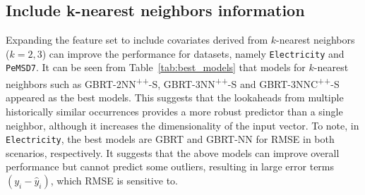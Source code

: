 \subsection{Include k-nearest neighbors information} %

Expanding the feature set to include covariates derived from $k$-nearest neighbors ($k=2, 3$) can improve the performance for datasets, namely \texttt{Electricity} and \texttt{PeMSD7}. 
It can be seen from Table~\ref{tab:best_models} that models for $k$-nearest neighbors such as \textsf{GBRT-2NN\textsuperscript{++}-S}, \textsf{GBRT-3NN\textsuperscript{++}-S} and \textsf{GBRT-3NNC\textsuperscript{++}-S} appeared as the best models.
This suggests that the lookaheads from multiple historically similar occurrences provides a more robust predictor than a single neighbor, although it increases the dimensionality of the input vector.
To note, in \texttt{Electricity}, the best models are \textsf{GBRT} and \textsf{GBRT-NN} for RMSE in both scenarios, respectively.
It suggests that the above models can improve overall performance but cannot predict some outliers, resulting in large error terms $(y_i - \hat{y}_i)$, which RMSE is sensitive to.